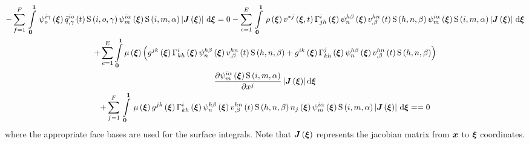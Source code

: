 \begin{multline}
   -\gsum{f=1}{F}{\gint{\vectr{0}}{\vectr{1}}{\idxgbfn{i}{o}{\gamma}{\vectr{\xi}}
       \fnof{\idxnodedof{\bar{q}}{i}{o}{\gamma}}{t}\idxgsf{i}{o}{\gamma}\idxgbfn{i}{m}{\alpha}{\vectr{\xi}}\idxgsf{i}{m}{\alpha}\abs{\fnof{\matr{J}}{\vectr{\xi}}}}{\vectr{\xi}}}=0
   -\gsum{e=1}{E}{
     \gint{\vectr{0}}{\vectr{1}}{
       \fnof{\rho}{\vectr{\xi}}\fnof{v^{*j}}{\vectr{\xi},t}\fnof{\christoffel{i}{j}{h}}{\vectr{\xi}}
       \idxgbfn{h}{n}{\beta}{\vectr{\xi}}\fnof{\idxnodedof{v}{h}{n}{\beta}}{t}\idxgsf{h}{n}{\beta}
       \idxgbfn{i}{m}{\alpha}{\vectr{\xi}}\idxgsf{i}{m}{\alpha}\abs{\fnof{\matr{J}}{\vectr{\xi}}}}{\vectr{\xi}}}\\
   +\dsuml{e=1}{E} \dintl{\vectr{0}}{\vectr{1}}
   \fnof{\mu}{\vectr{\xi}}\pbrac{\fnof{g^{jk}}{\vectr{\xi}}\fnof{\christoffel{i}{k}{h}}{\vectr{\xi}}
   \idxgbfn{h}{n}{\beta}{\vectr{\xi}}\fnof{\idxnodedof{v}{h}{n}{\beta}}{t}\idxgsf{h}{n}{\beta}
   +\fnof{g^{ik}}{\vectr{\xi}}\fnof{\christoffel{j}{k}{h}}{\vectr{\xi}}\idxgbfn{h}{n}{\beta}{\vectr{\xi}}
   \fnof{\idxnodedof{v}{h}{n}{\beta}}{t}\idxgsf{h}{n}{\beta}}\\
   \delby{\idxgbfn{i}{m}{\alpha}{\vectr{\xi}}\idxgsf{i}{m}{\alpha}}{x^{j}}
   \abs{\fnof{\matr{J}}{\vectr{\xi}}}\exteriorderiv{\vectr{\xi}}\\
   +\gsum{f=1}{F}{\gint{\vectr{0}}{\vectr{1}}{\fnof{\mu}{\vectr{\xi}}
       \fnof{g^{jk}}{\vectr{\xi}}\fnof{\christoffel{i}{k}{h}}{\vectr{\xi}}\idxgbfn{h}{n}{\beta}{\vectr{\xi}}
       \fnof{\idxnodedof{v}{h}{n}{\beta}}{t}\idxgsf{h}{n}{\beta}\fnof{n_{j}}{\vectr{\xi}}
       \idxgbfn{i}{m}{\alpha}{\vectr{\xi}}\idxgsf{i}{m}{\alpha}\abs{\fnof{\matr{J}}{\vectr{\xi}}}}{\vectr{\xi}}}==0
   \label{eqn:FEM4StokesEquation}
\end{multline}
where the appropriate face bases are used for the surface integrals. Note that
$\fnof{\matr{J}}{\vectr{\xi}}$ represents the jacobian matrix from $ \boldsymbol{x} $
to $ \boldsymbol{\xi} $ coordinates.

